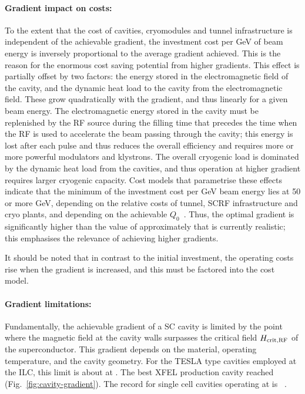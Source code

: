 \paragraph{Gradient impact on costs:}
To the extent that the cost of cavities, cryomodules and tunnel infrastructure is independent of the achievable gradient, the investment cost per GeV of beam energy is inversely proportional to the average gradient achieved. This is the reason for the enormous cost saving potential from higher gradients.
This effect is partially offset by two factors:  the energy stored in the electromagnetic field of the cavity, and the dynamic heat load to the cavity from the electromagnetic field.  These grow quadratically with the gradient, and thus linearly for a given beam energy.
The electromagnetic energy stored in the cavity must be replenished by the RF source during the filling time that precedes the time when the RF is used to accelerate the beam passing through the cavity; this energy is lost after each pulse and thus reduces the overall efficiency and requires more or more powerful modulators and klystrons.
The overall cryogenic load is dominated by the dynamic heat load from the cavities, and thus operation at higher gradient requires larger cryogenic capacity.
Cost models that parametrise these effects indicate that the minimum of the investment cost per GeV beam energy lies at \num{50} or more GeV, depending on the relative costs of tunnel, SCRF infrastructure and cryo plants, and depending on the achievable $Q_0$~\cite{Adolphsen:2011a}. 
Thus,  the optimal gradient is significantly higher than the value of approximately  that is currently realistic; this emphasises  the relevance of achieving higher gradients.

It should be noted that in contrast to the initial investment, 
the operating costs rise when the gradient is increased, and this must be factored into 
the cost model.

\paragraph{Gradient limitations:}
Fundamentally, the achievable gradient of a SC cavity is limited by the point where the magnetic field at the cavity walls surpasses the critical field $H_{\mathrm{crit,RF}}$ of the superconductor.
This gradient depends on the material, operating temperature, and the cavity geometry. 
For the TESLA type cavities employed at the ILC, this limit is about  at .
The best XFEL production cavity reached  (Fig.~\ref{fig:cavity-gradient}).
The record for single cell cavities operating at  is ~\cite{Eremeev:2007zza}.
%

